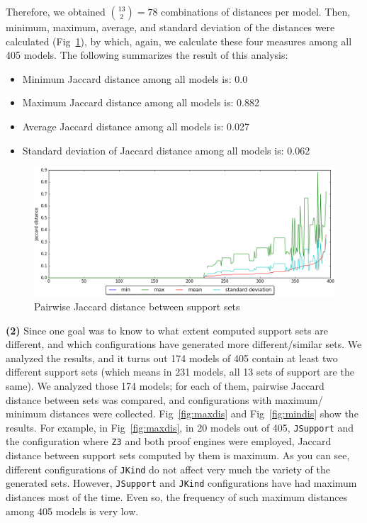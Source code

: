 Therefore, we obtained $\binom{13}{2} = 78$ combinations of distances per model. Then, minimum, maximum, average, and standard deviation of the distances were calculated (Fig~\ref{fig:jacdis}), by which, again, we calculate these four measures among all 405 models. The following summarizes the result of this analysis:
\begin{itemize}
  \item Minimum Jaccard distance among all models is: 0.0 
  \item Maximum Jaccard distance among all models is: 0.882 
  \item Average Jaccard distance among all models is: 0.027 
  \item Standard deviation of Jaccard distance among all models is: 0.062 
\end{itemize}


\begin{figure}
  \centering
  \includegraphics[width=\textwidth]{figs/jacdis.png}
  \caption{\small{Pairwise Jaccard distance between support sets}}\label{fig:jacdis}
\end{figure}

\vspace{6pt}
\noindent{}
 \vspace{9pt}
 
\textbf{(2)} Since one goal was to know to what extent computed support sets are different, and which configurations have generated more different/similar sets. We analyzed the results,
and it turns out 174 models of 405 contain at least two different support sets (which means in 231 models, all 13 sets of support are the same). We analyzed those 174 models; for each of them, pairwise Jaccard distance between sets was compared, and configurations with maximum/ minimum distances were collected. Fig~\ref{fig:maxdis} and Fig~\ref{fig:mindis} show the results. For example, in Fig~\ref{fig:maxdis}, in 20 models out of 405, \texttt{JSupport} and the configuration where \texttt{Z3} and both proof engines were employed, Jaccard distance between support sets computed by them is maximum. As you can see, different configurations of \texttt{JKind} do not affect very much the variety of the generated sets. However, \texttt{JSupport} and \texttt{JKind} configurations have had maximum distances most of the time. Even so, the frequency of such maximum distances among 405 models is very low.


